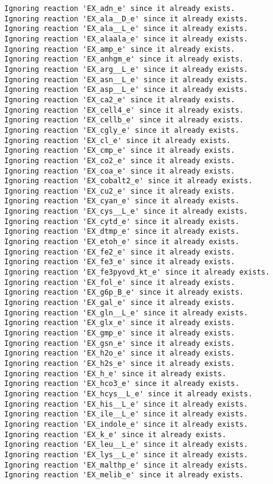 \documentclass[
  letterpaper,
  DIV=11,
  numbers=noendperiod]{scrartcl}
\begin{document}
\begin{verbatim}
Ignoring reaction 'EX_adn_e' since it already exists.
Ignoring reaction 'EX_ala__D_e' since it already exists.
Ignoring reaction 'EX_ala__L_e' since it already exists.
Ignoring reaction 'EX_alaala_e' since it already exists.
Ignoring reaction 'EX_amp_e' since it already exists.
Ignoring reaction 'EX_anhgm_e' since it already exists.
Ignoring reaction 'EX_arg__L_e' since it already exists.
Ignoring reaction 'EX_asn__L_e' since it already exists.
Ignoring reaction 'EX_asp__L_e' since it already exists.
Ignoring reaction 'EX_ca2_e' since it already exists.
Ignoring reaction 'EX_cell4_e' since it already exists.
Ignoring reaction 'EX_cellb_e' since it already exists.
Ignoring reaction 'EX_cgly_e' since it already exists.
Ignoring reaction 'EX_cl_e' since it already exists.
Ignoring reaction 'EX_cmp_e' since it already exists.
Ignoring reaction 'EX_co2_e' since it already exists.
Ignoring reaction 'EX_coa_e' since it already exists.
Ignoring reaction 'EX_cobalt2_e' since it already exists.
Ignoring reaction 'EX_cu2_e' since it already exists.
Ignoring reaction 'EX_cyan_e' since it already exists.
Ignoring reaction 'EX_cys__L_e' since it already exists.
Ignoring reaction 'EX_cytd_e' since it already exists.
Ignoring reaction 'EX_dtmp_e' since it already exists.
Ignoring reaction 'EX_etoh_e' since it already exists.
Ignoring reaction 'EX_fe2_e' since it already exists.
Ignoring reaction 'EX_fe3_e' since it already exists.
Ignoring reaction 'EX_fe3pyovd_kt_e' since it already exists.
Ignoring reaction 'EX_fol_e' since it already exists.
Ignoring reaction 'EX_g6p_B_e' since it already exists.
Ignoring reaction 'EX_gal_e' since it already exists.
Ignoring reaction 'EX_gln__L_e' since it already exists.
Ignoring reaction 'EX_glx_e' since it already exists.
Ignoring reaction 'EX_gmp_e' since it already exists.
Ignoring reaction 'EX_gsn_e' since it already exists.
Ignoring reaction 'EX_h2o_e' since it already exists.
Ignoring reaction 'EX_h2s_e' since it already exists.
Ignoring reaction 'EX_h_e' since it already exists.
Ignoring reaction 'EX_hco3_e' since it already exists.
Ignoring reaction 'EX_hcys__L_e' since it already exists.
Ignoring reaction 'EX_his__L_e' since it already exists.
Ignoring reaction 'EX_ile__L_e' since it already exists.
Ignoring reaction 'EX_indole_e' since it already exists.
Ignoring reaction 'EX_k_e' since it already exists.
Ignoring reaction 'EX_leu__L_e' since it already exists.
Ignoring reaction 'EX_lys__L_e' since it already exists.
Ignoring reaction 'EX_malthp_e' since it already exists.
Ignoring reaction 'EX_melib_e' since it already exists.

\end{verbatim}
\end{document}
